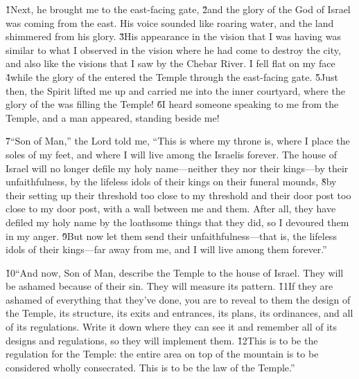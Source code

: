 \v{1}Next, he brought me to the east-facing gate, \v{2}and the glory of the God of Israel was coming from the east. His voice sounded like roaring water, and the land shimmered from his glory. \v{3}His appearance in the vision that I was having was similar to what I observed in the vision where he had come to destroy the city, and also like the visions that I saw by the Chebar River. I fell flat on my face \v{4}while the glory of the  entered the Temple through the east-facing gate. \v{5}Just then, the Spirit lifted me up and carried me into the inner courtyard, where the glory of the  was filling the Temple! \v{6}I heard someone speaking to me from the Temple, and a man appeared, standing beside me!

\v{7}``Son of Man,'' the Lord  told me, ``This is where my throne is, where I place the soles of my feet, and where I will live among the Israelis forever. The house of Israel will no longer defile my holy name---neither they nor their kings---by their unfaithfulness, by the lifeless idols of their kings on their funeral mounds, \v{8}by their setting up their threshold too close to my threshold and their door post too close to my door post, with a wall between me and them. After all, they have defiled my holy name by the loathsome things that they did, so I devoured them in my anger. \v{9}But now let them send their unfaithfulness---that is, the lifeless idols of their kings---far away from me, and I will live among them forever.''

\v{10}``And now, Son of Man, describe the Temple to the house of Israel. They will be ashamed because of their sin. They will measure its pattern. \v{11}If they are ashamed of everything that they've done, you are to reveal to them the design of the Temple, its structure, its exits and entrances, its plans, its ordinances, and all of its regulations. Write it down where they can see it and remember all of its designs and regulations, so they will implement them. \v{12}This is to be the regulation for the Temple: the entire area on top of the mountain is to be considered wholly consecrated. This is to be the law of the Temple.''


